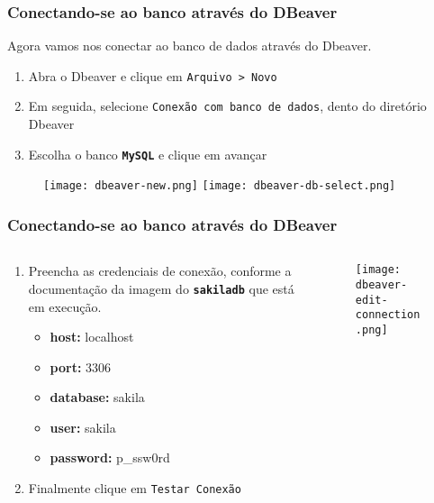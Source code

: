 \documentclass[t, 10pt, aspectratio=169, table, x11names]{beamer}
\begin{document}
	\begin{frame}[t]
		\frametitle{Conectando-se ao banco através do DBeaver}
		Agora vamos nos conectar ao banco de dados através do Dbeaver.
		
		\begin{enumerate}
			\small
			\item Abra o Dbeaver e clique em \texttt{Arquivo > Novo}
			\item Em seguida, selecione \texttt{Conexão com banco de dados}, dento do diretório Dbeaver
			\item Escolha o banco \texttt{\textbf{MySQL}} e clique em avançar
		\end{enumerate}
		
		\vspace{0.1cm}
		\begin{figure}[h]
			\texttt{[image: dbeaver-new.png]}
			\hspace{0.5cm}
			\texttt{[image: dbeaver-db-select.png]}
		\end{figure}
	\end{frame}
	
	\begin{frame}
		\frametitle{Conectando-se ao banco através do DBeaver}
		\vspace{0.05cm}
		\begin{columns}[t]
			\begin{column}{0.50\linewidth}
				\centering
				\begin{enumerate}
					\small
					\setcounter{enumi}{3}
					\item Preencha as credenciais de conexão, conforme a documentação da imagem do \textbf{\texttt{sakiladb}} que está em execução.
					\begin{itemize}
						\item \textbf{host:} localhost
						\item \textbf{port:} 3306
						\item \textbf{database:} sakila
						\item \textbf{user:} sakila
						\item \textbf{password:} p\_ssw0rd
					\end{itemize}
					\vspace{0.15cm}
					\item Finalmente clique em \texttt{Testar Conexão}
				\end{enumerate}
			\end{column}
			\begin{column}{0.45\linewidth}
				\begin{figure}[h]
					\texttt{[image: dbeaver-edit-connection.png]}
				\end{figure}
			\end{column}
		\end{columns}
	\end{frame}
	
\end{document}
